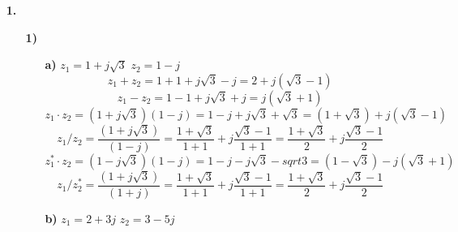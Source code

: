 \documentclass[a4paper,11pt]{article}
\author{\authorinfotitle}
\title{\titleinfo}
\date{\today}
\begin{document}
	\maketitle
	\begin{enumerate}
		\item[\textbf{1.}]
		\begin{enumerate}
			\item[\textbf{1)}]
			\begin{enumerate}
			\item[\textbf{a)}] $z_1 = 1+j\sqrt{3}$ $z_2=1-j$
			\begin{dmath*}
			z_1+z_2 = 1+1+j\sqrt{3}-j = 2+j(\sqrt{3}-1)
			\end{dmath*}
			\begin{dmath*}
			z_1-z_2 = 1-1+j\sqrt{3}+j = j(\sqrt{3}+1)
			\end{dmath*}
			\begin{dmath*}
			z_1 \cdot z_2 = (1+j\sqrt{3})(1-j)
			              = 1-j+j\sqrt{3}+\sqrt{3}
			              = (1+\sqrt{3})+j(\sqrt{3}-1)
			\end{dmath*}
			\begin{dmath*}
			z_1 / z_2 = \frac{(1+j\sqrt{3})}{(1-j)}
			          = \frac{1+\sqrt{3}}{1+1}+j\frac{\sqrt{3}-1}{1+1}
			          = \frac{1+\sqrt{3}}{2}+j\frac{\sqrt{3}-1}{2}
			\end{dmath*}
			\begin{dmath*}
			z_1^* \cdot z_2 = (1-j\sqrt{3})(1-j)
			              = 1-j-j\sqrt{3}-sqrt{3}
			              = (1-\sqrt{3})-j(\sqrt{3}+1)
			\end{dmath*}
			\begin{dmath*}
			z_1 / z_2^* = \frac{(1+j\sqrt{3})}{(1+j)}
			            = \frac{1+\sqrt{3}}{1+1}+j\frac{\sqrt{3}-1}{1+1}
			            = \frac{1+\sqrt{3}}{2}+j\frac{\sqrt{3}-1}{2}
			\end{dmath*}
			
			\item[\textbf{b)}] $z_1 = 2+3j$ $z_2=3-5j$
			

\end{enumerate}
\end{enumerate}
\end{enumerate}
\end{document}
